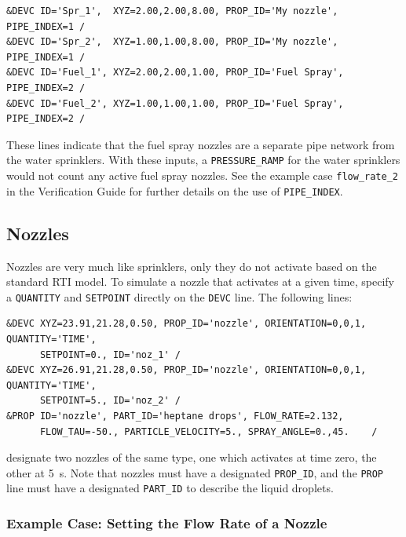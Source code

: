 \documentclass[11pt]{book}
\newcommand{\ct}{\tt\small}
\begin{document}
\footnotesize
\begin{verbatim}
&DEVC ID='Spr_1',  XYZ=2.00,2.00,8.00, PROP_ID='My nozzle',  PIPE_INDEX=1 /
&DEVC ID='Spr_2',  XYZ=1.00,1.00,8.00, PROP_ID='My nozzle',  PIPE_INDEX=1 /
&DEVC ID='Fuel_1', XYZ=2.00,2.00,1.00, PROP_ID='Fuel Spray', PIPE_INDEX=2 /
&DEVC ID='Fuel_2', XYZ=1.00,1.00,1.00, PROP_ID='Fuel Spray', PIPE_INDEX=2 /
\end{verbatim}
\normalsize

\noindent These lines indicate that the fuel spray nozzles are a separate pipe network from the water sprinklers.  With these
inputs, a {\ct PRESSURE\_RAMP} for the water sprinklers would not count any active fuel spray nozzles.  See the example case 
{\ct flow\_rate\_2} in the Verification Guide for further details on the use of {\ct PIPE\_INDEX}.

\subsection{Nozzles}
\label{info:nozzles}

Nozzles are very much like sprinklers, only they do not activate based on the standard RTI model.
To simulate a nozzle that activates at a given time,
specify a {\ct QUANTITY} and {\ct SETPOINT} directly on the {\ct DEVC} line.
The following lines:

\footnotesize
\begin{verbatim}
&DEVC XYZ=23.91,21.28,0.50, PROP_ID='nozzle', ORIENTATION=0,0,1, QUANTITY='TIME',
      SETPOINT=0., ID='noz_1' /
&DEVC XYZ=26.91,21.28,0.50, PROP_ID='nozzle', ORIENTATION=0,0,1, QUANTITY='TIME',
      SETPOINT=5., ID='noz_2' /
&PROP ID='nozzle', PART_ID='heptane drops', FLOW_RATE=2.132,
      FLOW_TAU=-50., PARTICLE_VELOCITY=5., SPRAY_ANGLE=0.,45.    /
\end{verbatim}
\normalsize

\noindent
designate two nozzles of the same type, one which activates at time zero, the other at 5~s. Note that nozzles must have a designated
{\ct PROP\_ID}, and the {\ct PROP} line must have a designated {\ct PART\_ID} to describe the liquid droplets.

\subsubsection{Example Case: Setting the Flow Rate of a Nozzle}
\end{document}
